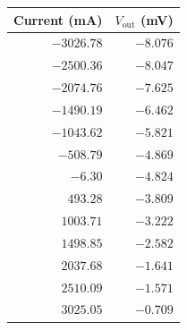 \documentclass[12pt,a4paper]{article}
\begin{document}
\begin{figure}[H]
    \centering
    
    \begin{minipage}[c]{0.40\textwidth}
        \centering
        \label{tab:naive-sat-before}
        \small 
        \begin{tabular}{@{}rr@{}}
            \toprule
            Current (mA) & $V_{\text{out}}$ (mV) \\
            \midrule
            $-3026.78$ & $-8.076$ \\
            $-2500.36$ & $-8.047$ \\
            $-2074.76$ & $-7.625$ \\
            $-1490.19$ & $-6.462$ \\
            $-1043.62$ & $-5.821$ \\
            $-508.79$  & $-4.869$ \\
            $-6.30$    & $-4.824$ \\
            $493.28$   & $-3.809$ \\
            $1003.71$  & $-3.222$ \\
            $1498.85$  & $-2.582$ \\
            $2037.68$  & $-1.641$ \\
            $2510.09$  & $-1.571$ \\
            $3025.05$  & $-0.709$ \\
            \bottomrule
        \end{tabular}
        
        \vspace{1.5cm} 
        

\end{minipage}
\end{figure}
\end{document}
